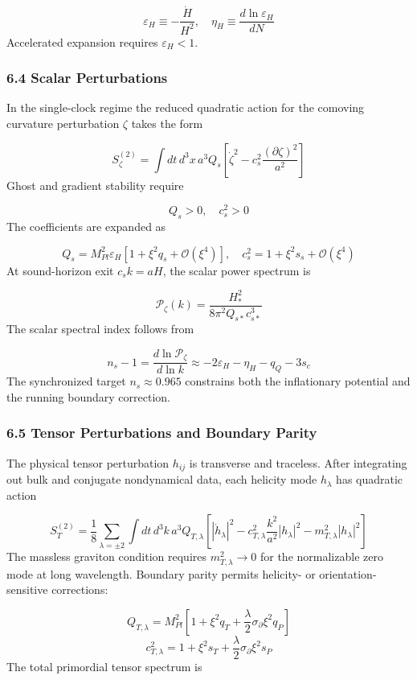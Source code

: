 \documentclass[aps,prd,onecolumn,superscriptaddress,nofootinbib,longbibliography,10pt]{revtex4-2}
\begin{document}
  \[ \varepsilon_H \equiv -\frac{\dot{H}}{H^2}, \quad \eta_H \equiv \frac{d\ln\varepsilon_H}{dN} \]
  Accelerated expansion requires \(\varepsilon_H < 1\).



  
\subsubsection*{6.4 Scalar Perturbations}

  In the single-clock regime the reduced quadratic action for the comoving curvature perturbation \(\zeta\) takes the form


  \[ S_\zeta^{(2)} = \int dt\, d^3x\, a^3 Q_s \left[ \dot{\zeta}^2 - c_s^2 \frac{(\partial\zeta)^2}{a^2} \right] \]
  Ghost and gradient stability require


  \[ Q_s > 0, \quad c_s^2 > 0 \]
  The coefficients are expanded as


  \[ Q_s = M_{Pl}^2 \varepsilon_H [1 + \xi^2 q_s + \mathcal{O}(\xi^4)], \quad c_s^2 = 1 + \xi^2 s_s + \mathcal{O}(\xi^4) \]
  At sound-horizon exit \(c_s k = aH\), the scalar power spectrum is


  \[ \mathcal{P}_\zeta(k) = \frac{H_*^2}{8\pi^2 Q_{s*} c_{s*}^3} \]
  The scalar spectral index follows from


  \[ n_s - 1 = \frac{d\ln\mathcal{P}_\zeta}{d\ln k} \approx -2\varepsilon_H - \eta_H - q_Q - 3s_c \]
  The synchronized target \(n_s \approx 0.965\) constrains both the inflationary potential and the running boundary correction.



  
\subsubsection*{6.5 Tensor Perturbations and Boundary Parity}

  The physical tensor perturbation \(h_{ij}\) is transverse and traceless. After integrating out bulk and conjugate nondynamical data, each helicity mode \(h_\lambda\) has quadratic action


  \[ S_T^{(2)} = \frac{1}{8} \sum_{\lambda=\pm 2} \int dt\, d^3k\, a^3 Q_{T,\lambda} \left[ |\dot{h}_\lambda|^2 - c_{T,\lambda}^2 \frac{k^2}{a^2}|h_\lambda|^2 - m_{T,\lambda}^2 |h_\lambda|^2 \right] \]
  The massless graviton condition requires \(m_{T,\lambda}^2 \to 0\) for the normalizable zero mode at long wavelength. Boundary parity permits helicity- or orientation-sensitive corrections:


  \[ Q_{T,\lambda} = M_{Pl}^2 \left[ 1 + \xi^2 q_T + \frac{\lambda}{2}\sigma_\partial \xi^2 q_P \right] \]
  \[ c_{T,\lambda}^2 = 1 + \xi^2 s_T + \frac{\lambda}{2}\sigma_\partial \xi^2 s_P \]
  The total primordial tensor spectrum is
\end{document}
